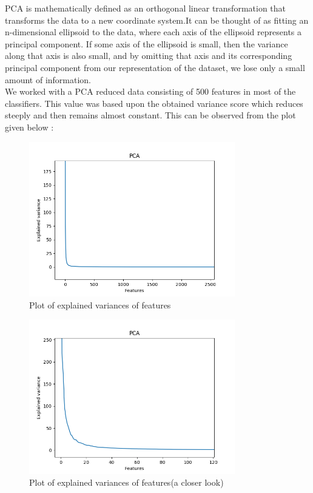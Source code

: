 \documentclass[12pt]{report}
\begin{document}
PCA is mathematically defined as an orthogonal linear transformation that transforms the
data to a new coordinate system.It can be thought of as fitting an n-dimensional ellipsoid to
the data, where each axis of the ellipsoid represents a principal component. If some axis of the
ellipsoid is small, then the variance along that axis is also small, and by omitting that axis and
its corresponding principal component from our representation of the dataset, we lose only a
small amount of information.\\

We worked with a PCA reduced data consisting of 500 features in most of the classifiers. This value was based upon the obtained variance score which reduces steeply and then remains almost constant. This can be observed from the plot given below :

\begin{figure}[H]
  \centering
  \includegraphics[width=0.8\textwidth]{Images/pca_var.png}
  \caption{Plot of explained variances of features}
\end{figure}

\begin{figure}[H]
  \centering
  \includegraphics[width=0.8\textwidth]{Images/pca_var_zoom.png}
  \caption{Plot of explained variances of features(a closer look)}
\end{figure}
\end{document}
